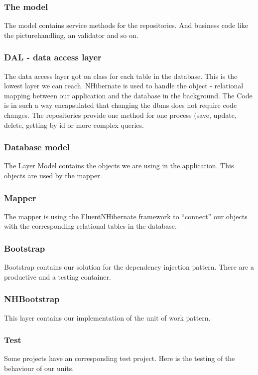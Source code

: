 \documentclass{article}
\begin{document}
\subsubsection{The model}
The model contains service methods for the repositories. And business code like
the picturehandling, an validator and so on.

\subsubsection{DAL - data access layer}
The data access layer got on class for each table in the database.
This is the lowest layer we can reach. NHibernate is used to handle the object
- relational mapping between our application and the database in the background.
The Code is in such a way encapsulated that changing the dbms does not
require code changes.
The repositories provide one method for one process (save, update, delete,
getting by id or more complex queries.

\subsubsection{Database model}
The Layer Model contains the objects we are using in the application.
This objects are used by the mapper.

\subsubsection{Mapper}
The mapper is using the FluentNHibernate framework to ``connect'' our objects
with the corresponding relational tables in the database.

\subsubsection{Bootstrap}
Bootstrap contains our solution for the dependency injection pattern.
There are a productive and a testing container.

\subsubsection{NHBootstrap}
This layer contains our implementation of the unit of work pattern.

\subsubsection{Test}
Some projects have an corresponding test project.
Here is the testing of the behaviour of our units.
\end{document}
